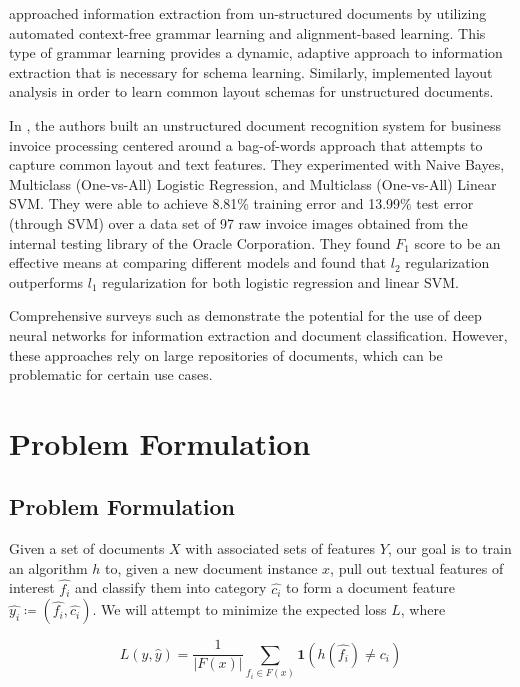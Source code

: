 \documentclass[twoside,11pt]{article}
\renewcommand{\>}{{\rightarrow}}
\renewcommand{\hat}{\widehat}
\newcommand{\1}{{\mathbf 1}}
\newcommand{\0}{{\mathbf 0}}
\begin{document}
\cite{Thakur2012} approached information extraction from un-structured documents by utilizing automated context-free grammar learning and alignment-based learning. This type of grammar learning provides a dynamic, adaptive approach to information extraction that is necessary for schema learning. Similarly, \cite{Dejean2015} implemented layout analysis in order to learn common layout schemas for unstructured documents.

In \cite{LiuWanZhang2016}, the authors built an unstructured document recognition system for business invoice processing centered around a bag-of-words approach that attempts to capture common layout and text features. They experimented with Naive Bayes, Multiclass (One-vs-All) Logistic Regression, and Multiclass (One-vs-All) Linear SVM. They were able to achieve 8.81\% training error and 13.99\% test error (through SVM) over a data set of 97 raw invoice images obtained from the internal testing library of the Oracle Corporation. They found $F_1$ score to be an effective means at comparing different models and found that $l_2$ regularization outperforms $l_1$ regularization for both logistic regression and linear SVM.

Comprehensive surveys such as \cite{Kumar2017, Nguyen2017} demonstrate the potential for the use of deep neural networks for information extraction and document classification. However, these approaches rely on large repositories of documents, which can be problematic for certain use cases.



\section{Problem Formulation}
\subsection{Problem Formulation}
Given a set of documents $X$ with associated sets of features $Y$, our goal is to train an algorithm $h$ to, given a new document instance $x$, pull out textual features of interest $\hat{f_i}$ and classify them into category $\hat{c_i}$ to form a document feature $\hat{y_i} \coloneqq (\hat{f_i}, \hat{c_i})$. We will attempt to minimize the expected loss $L$, where 

  \[ L(y, \hat{y}) = \frac{1}{|F(x)|}\sum_{f_i \in F(x)}{\mathbf{1}(h(\hat{f_i}) \ne c_i)} \] 
\end{document}
